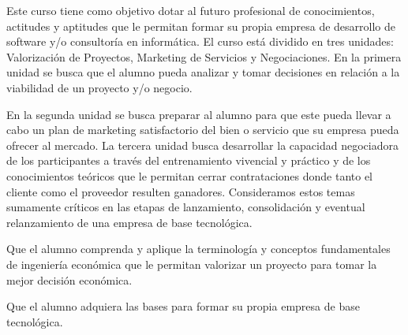 \begin{syllabus}


\begin{justification}
Este curso tiene como objetivo dotar al futuro profesional de conocimientos, actitudes y aptitudes que le permitan formar su propia empresa de desarrollo de software y/o consultoría en informática. El curso está dividido en tres unidades: Valorización de Proyectos, Marketing de Servicios y Negociaciones. En la primera unidad se busca que el alumno pueda analizar y tomar decisiones en relación a la viabilidad de un proyecto y/o negocio.

En la segunda unidad se busca preparar al alumno para que este pueda llevar a cabo un plan de marketing satisfactorio del bien o servicio que su empresa pueda ofrecer al mercado. La tercera unidad busca desarrollar la capacidad negociadora de los participantes a través del entrenamiento vivencial y práctico y de los conocimientos teóricos que le permitan cerrar contrataciones donde tanto el cliente como el proveedor resulten ganadores. Consideramos estos temas sumamente críticos en las etapas de lanzamiento, consolidación y eventual relanzamiento de una empresa de base tecnológica.
\end{justification}

\begin{goals}
\item Que el alumno comprenda y aplique la terminología y conceptos fundamentales de ingeniería económica que le permitan valorizar un proyecto para tomar la mejor decisión económica.
\item Que el alumno adquiera las bases para formar su propia empresa de base tecnológica.
\end{goals}

\begin{outcomes}
    \item {}
    \item {}
    \item {}
\end{outcomes}

\begin{competences}
    \item {} 
    \item {}
    \item {}
    \item {}
    \item {}
    \item {}
    \item {}
    \item {}
\end{competences}


\end{syllabus}
